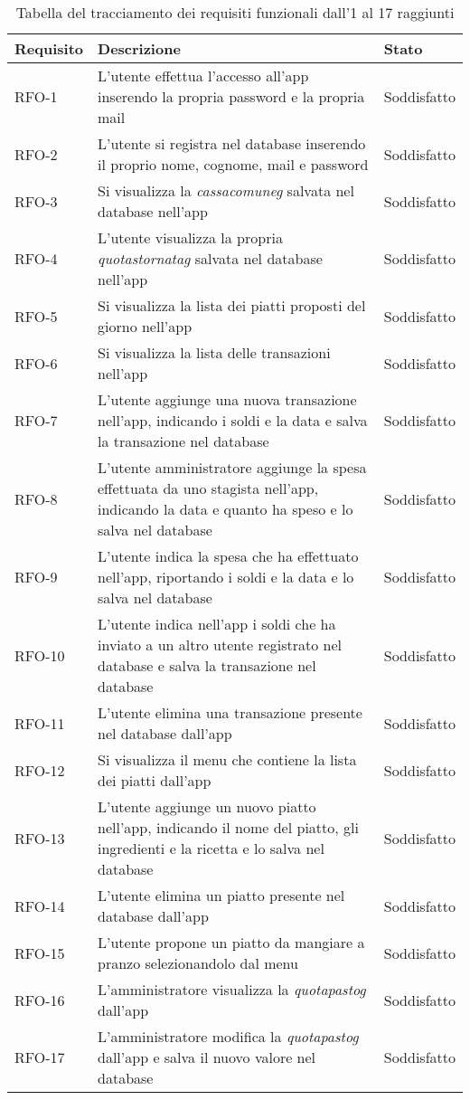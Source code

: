 \begin{table}[htb]%
\caption{Tabella del tracciamento dei requisiti funzionali dall'1 al 17 raggiunti}
\label{tab:reqfunzionali-raggiunti}
\begin{tabularx}{\textwidth}{lXl}
\hline
\textbf{Requisito} & \textbf{Descrizione} & \textbf{Stato}\\
\hline\hline
RFO-1     & L'utente effettua l'accesso all'app inserendo la propria password e la propria mail & Soddisfatto \\
\hline
RFO-2     & L'utente si registra nel database inserendo il proprio nome, cognome, mail e password & Soddisfatto\\
\hline
RFO-3     & Si visualizza la \emph{\gls{cassacomuneg}} salvata nel database nell'app & Soddisfatto \\
\hline
RFO-4     & L'utente visualizza la propria \emph{\gls{quotastornatag}} salvata nel database nell'app & Soddisfatto \\
\hline
RFO-5     & Si visualizza la lista dei piatti proposti del giorno nell'app & Soddisfatto \\
\hline
RFO-6     & Si visualizza la lista delle transazioni nell'app & Soddisfatto \\
\hline
RFO-7     & L'utente aggiunge una nuova transazione nell'app, indicando i soldi e la data e salva la transazione nel database & Soddisfatto \\
\hline
RFO-8     & L'utente amministratore aggiunge la spesa effettuata da uno stagista nell'app, indicando la data e quanto ha speso e lo salva nel database & Soddisfatto \\
\hline
RFO-9     & L'utente indica la spesa che ha effettuato nell'app, riportando i soldi e la data e lo salva nel database & Soddisfatto \\
\hline
RFO-10    & L'utente indica nell'app i soldi che ha inviato a un altro utente registrato nel database e salva la transazione nel database & Soddisfatto \\
\hline
RFO-11    & L'utente elimina una transazione presente nel database dall'app & Soddisfatto \\
\hline
RFO-12    & Si visualizza il menu che contiene la lista dei piatti dall'app & Soddisfatto \\
\hline
RFO-13    & L'utente aggiunge un nuovo piatto nell'app, indicando il nome del piatto, gli ingredienti e la ricetta e lo salva nel database & Soddisfatto \\
\hline
RFO-14    & L'utente elimina un piatto presente nel database dall'app & Soddisfatto \\
\hline
RFO-15    & L'utente propone un piatto da mangiare a pranzo selezionandolo dal menu & Soddisfatto \\
\hline
RFO-16    & L'amministratore visualizza la \emph{\gls{quotapastog}} dall'app & Soddisfatto \\
\hline
RFO-17    & L'amministratore modifica la \emph{\gls{quotapastog}} dall'app e salva il nuovo valore nel database & Soddisfatto \\
\hline
\end{tabularx}
\end{table}%

